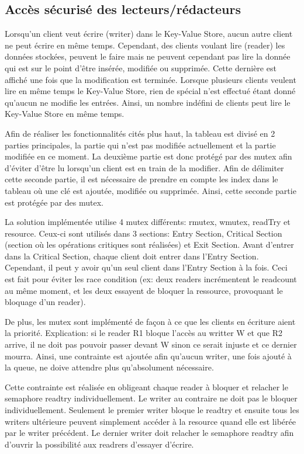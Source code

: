 \documentclass[11pt,a4paper]{article}
\begin{document}
\subsection{Accès sécurisé des lecteurs/rédacteurs \cite{Mutex}}
Lorsqu'un client veut écrire (writer) dans le Key-Value Store, aucun autre client ne peut écrire en même temps. Cependant, des clients voulant lire (reader) les données stockées, peuvent le faire mais ne peuvent cependant pas lire la donnée qui est sur le point d'être insérée, modifiée ou supprimée. Cette dernière est affiché une fois que la modification est terminée. Lorsque plusieurs clients veulent lire en même temps le Key-Value Store, rien de spécial n'est effectué étant donné qu'aucun ne modifie les entrées. Ainsi, un nombre indéfini de clients peut lire le Key-Value Store en même temps.

Afin de réaliser les fonctionnalités cités plus haut, la tableau est divisé en 2 parties principales, la partie qui n'est pas modifiée actuellement et la partie modifiée en ce moment. La deuxième partie est donc protégé par des mutex afin d'éviter d'être lu lorsqu'un client est en train de la modifier. Afin de délimiter cette seconde partie, il est nécessaire de prendre en compte les index dans le tableau où une clé est ajoutée, modifiée ou supprimée. Ainsi, cette seconde partie est protégée par des mutex. 

La solution implémentée utilise 4 mutex différents: rmutex, wmutex, readTry et resource. Ceux-ci sont utilisés dans 3 sections: Entry Section, Critical Section (section où les opérations critiques sont réalisées) et Exit Section. Avant d'entrer dans la Critical Section, chaque client doit entrer dans l'Entry Section. Cependant, il peut y avoir qu'un seul client dans l'Entry Section à la fois. Ceci est fait pour éviter les race condition (ex: deux readers incrémentent le readcount au même moment, et les deux essayent de bloquer la ressource, provoquant le bloquage d'un reader).

De plus, les mutex sont implémenté de façon à ce que les clients en écriture aient la priorité. Explication: si le reader R1 bloque l'accès au writter W et que R2 arrive, il ne doit pas pouvoir passer devant W sinon ce serait injuste et ce dernier mourra. Ainsi, une contrainte est ajoutée afin qu'aucun writer, une fois ajouté à la queue, ne doive attendre plus qu'absolument nécessaire. 

Cette contrainte est réalisée en obligeant chaque reader à bloquer et relacher le semaphore readtry individuellement. Le writer au contraire ne doit pas le bloquer individuellement. Seulement le premier writer bloque le readtry et ensuite tous les writers ultérieure peuvent simplement accéder à la resource quand elle est libérée par le writer précédent. Le dernier writer doit relacher le semaphore readtry afin d'ouvrir la possibilité aux readrers d'essayer d'écrire. 
\end{document}
